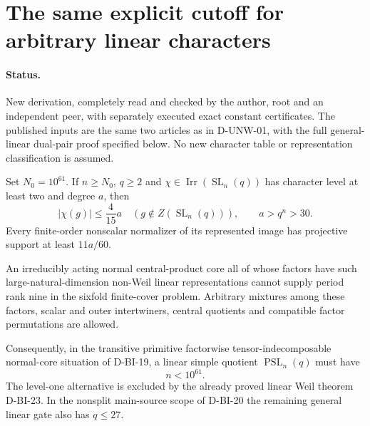 \section{The same explicit cutoff for arbitrary linear characters}
\label{sec:linear-nonweil-cutoff}

\paragraph{Status.}
New derivation, completely read and checked by the author, root and
an independent peer, with separately executed exact constant certificates. The published inputs are the same two articles as in
D-UNW-01, with the full general-linear dual-pair proof specified below.
No new character table or representation classification is assumed.

\begin{theorem}
\label{D-LNW-01}
Set $N_0=10^{61}$. If $n\ge N_0$, $q\ge2$ and
$\chi\in\operatorname{Irr}(\operatorname{SL}_n(q))$ has
character level at least two and degree $a$, then
\[
            |\chi(g)|\le\frac4{15}a
           \quad(g\notin Z(\operatorname{SL}_n(q))),
           \qquad a>q^n>30.                                \tag{LNW.1}
\]
Every finite-order nonscalar normalizer of its represented image has
projective support at least $11a/60$.

An irreducibly acting normal central-product core all of whose factors
have such large-natural-dimension non-Weil linear representations
cannot supply period rank nine in the sixfold finite-cover problem.
Arbitrary mixtures among these factors, scalar and outer intertwiners,
central quotients and compatible factor permutations are allowed.

Consequently, in the transitive primitive factorwise
tensor-indecomposable normal-core situation of D-BI-19, a linear
simple quotient $\operatorname{PSL}_n(q)$ must have
\[
                            n<10^{61}.                      \tag{LNW.2}
\]
The level-one alternative is excluded by the already proved linear
Weil theorem D-BI-23. In the nonsplit main-source scope of D-BI-20
the remaining general linear gate also has $q\le27$.
\end{theorem}

